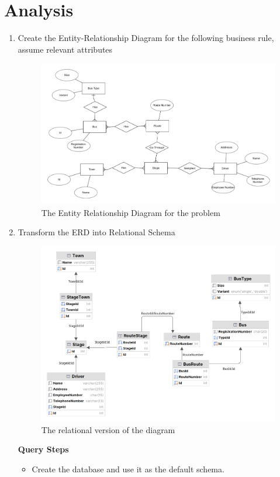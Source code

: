\documentclass[12pt,titlepage]{article}
\begin{document}
\section{Analysis}
\begin{enumerate}[label=\alph*.)]
    \item {
        Create the Entity-Relationship Diagram for the following business rule, assume relevant attributes

        \begin{figure}[h]
            \centering
            \includegraphics[width=.65\textwidth]{./images/erdplus.png}
            \caption{The Entity Relationship Diagram for the problem}
        \end{figure}
    }
    \item {
        Transform the ERD into Relational Schema

        \begin{figure}[h]
            \centering
            \includegraphics[width=.65\textwidth]{./images/erd.png}
            \caption{The relational version of the diagram}
        \end{figure}

        \pagebreak

        \Large{\textbf{Query Steps}}
        \begin{itemize}
            \item {
                Create the database and use it as the default schema.

}
\end{itemize}}
\end{enumerate}
\end{document}
